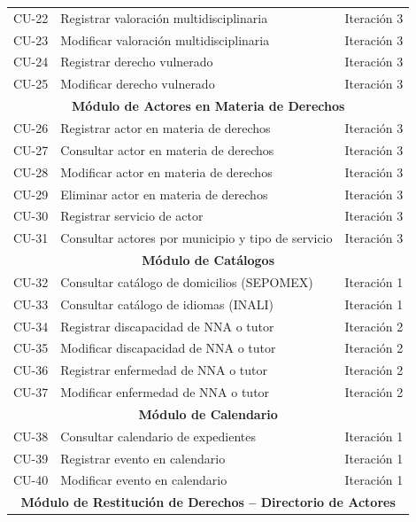 \begin{center}
\begin{longtable}{|c|p{}|c|}
		CU-22 & Registrar valoración multidisciplinaria   & Iteración 3 \\
		CU-23 & Modificar valoración multidisciplinaria   & Iteración 3 \\
		CU-24 & Registrar derecho vulnerado               & Iteración 3 \\
		CU-25 & Modificar derecho vulnerado               & Iteración 3 \\
		\hline
		\multicolumn{3}{|c|}{\textbf{Módulo de Actores en Materia de Derechos}} \\
		\hline
		CU-26 & Registrar actor en materia de derechos                & Iteración 3 \\
		CU-27 & Consultar actor en materia de derechos                & Iteración 3 \\
		CU-28 & Modificar actor en materia de derechos                & Iteración 3 \\
		CU-29 & Eliminar actor en materia de derechos                 & Iteración 3 \\
		CU-30 & Registrar servicio de actor                           & Iteración 3 \\
		CU-31 & Consultar actores por municipio y tipo de servicio    & Iteración 3 \\
		\hline
		\multicolumn{3}{|c|}{\textbf{Módulo de Catálogos}} \\
		\hline
		CU-32 & Consultar catálogo de domicilios (SEPOMEX)    & Iteración 1 \\
		CU-33 & Consultar catálogo de idiomas (INALI)         & Iteración 1 \\
		CU-34 & Registrar discapacidad de NNA o tutor         & Iteración 2 \\
		CU-35 & Modificar discapacidad de NNA o tutor         & Iteración 2 \\
		CU-36 & Registrar enfermedad de NNA o tutor           & Iteración 2 \\
		CU-37 & Modificar enfermedad de NNA o tutor           & Iteración 2 \\
		\hline
		\multicolumn{3}{|c|}{\textbf{Módulo de Calendario}} \\
		\hline
		CU-38 & Consultar calendario de expedientes   & Iteración 1 \\
		CU-39 & Registrar evento en calendario        & Iteración 1 \\
		CU-40 & Modificar evento en calendario        & Iteración 1 \\
		\hline
		\multicolumn{3}{|c|}{\textbf{Módulo de Restitución de Derechos -- Directorio de Actores}} \\

\end{longtable}
\end{center}
